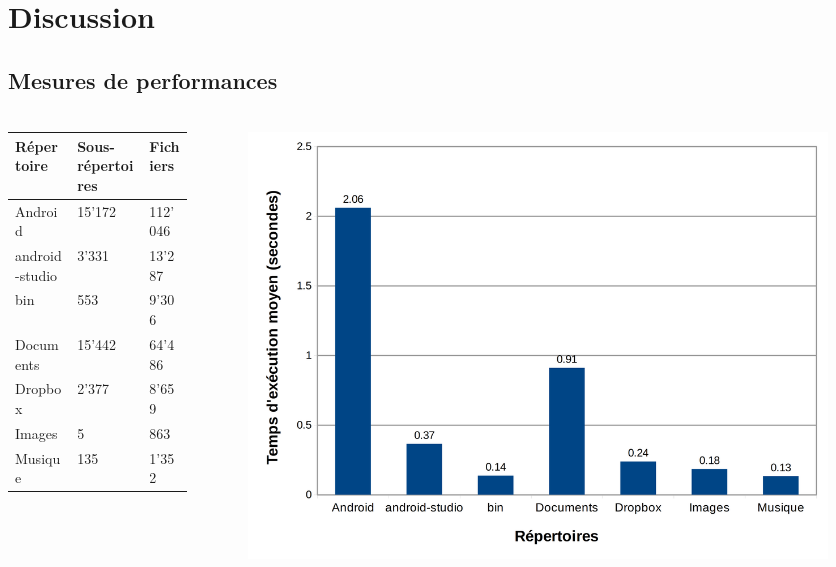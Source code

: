 \documentclass[10pt]{beamer}
\begin{document}
\section{Discussion}
\subsection{Mesures de performances}
\begin{frame}
    \frametitle{\subsecname}
    \begin{columns}[T]
        \begin{column}{.35\textwidth}
        \fontsize{6pt}{8}\selectfont
            \begin{tabularx}{4cm}{|p{1cm}|p{1cm}|X|} \hline
                \textbf{Répertoire} & \textbf{Sous-répertoires} & \textbf{Fichiers} \\ \hline
                Android & 15'172 & 112'046 \\ \hline
                android-studio & 3'331 & 13'287 \\ \hline
                bin & 553 & 9'306 \\ \hline
                Documents & 15'442 & 64'486 \\ \hline
                Dropbox & 2'377 & 8'659 \\ \hline
                Images & 5 & 863 \\ \hline
                Musique & 135 & 1'352 \\ \hline
            \end{tabularx}
        \end{column}
        \pause
        \begin{column}{.65\textwidth}
            \begin{figure}
                \begin{center}
                    \includegraphics[width=1\textwidth]{images/histo3.png}
                \end{center}
            \end{figure}
        \end{column}
    \end{columns}
\end{frame}
\end{document}
